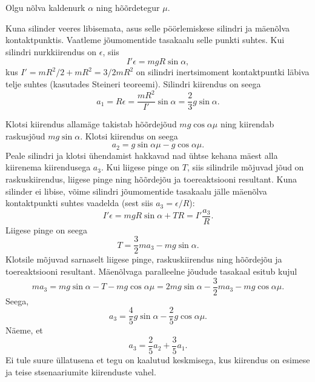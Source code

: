 \newcommand{\magnetvali}{
    \begin{tikzpicture}[scale=0.70]
        \draw (-4,0) -- (4,0);
        \draw (0,-4) -- (0,4);

        \draw[thick,->] (0,2) node [anchor = east] {$(0,h)$}
                            -- ++(60:1.6)
                            node [midway, anchor = west] {$\Vec{v}$};
        \draw (0,2) -- ++ (60:1) node [midway, anchor = south east, xshift = 6] {$\alpha$}
            arc (60:90:1);

        \draw (-2,2) circle (0.25) node[above, anchor = south, yshift = 5] {$B_1$};
        \filldraw (-2,2) circle (0.05);
        
        \draw (2,-2) circle (0.25) node[above, anchor = south, yshift = 5] {$B_1$};
        \filldraw (2,-2) circle (0.05);

        \draw (2,2) circle (0.25) node[above, anchor = south, yshift = 5] {$B_2$};
        \draw (2.25,2) -- (1.75,2);
        \draw (2,1.75) -- (2,2.25);

        \draw (-2,-2) circle (0.25) node[above, anchor = south, yshift = 5] {$B_2$};
        \draw (-2.25,-2) -- (-1.75,-2);
        \draw (-2,-1.75) -- (-2,-2.25);
        
    \end{tikzpicture}
} 

\setlength{\columnsep}{20pt}

\hint

\solu
Olgu nõlva kaldenurk $\alpha$ ning hõõrdetegur $\mu$.

Kuna silinder veeres libisemata, asus selle pöörlemiskese silindri ja mäenõlva kontaktpunktis. Vaatleme jõumomentide tasakaalu selle punkti suhtes. Kui silindri nurkkiirendus on $\epsilon$, siis
\[
I'\epsilon = mgR\sin\alpha,
\]
kus $I' = mR^2/2 + mR^2 = 3/2 mR^2$ on silindri inertsimoment kontaktpuntki läbiva telje suhtes (kasutades Steineri teoreemi). Silindri kiirendus on seega
\[
a_1 = R\epsilon = \frac{mR^2}{I'} \sin\alpha = \frac{2}{3}g\sin\alpha.
\]

Klotsi kiirendus allamäge takistab hõõrdejõud $mg\cos\alpha \mu$ ning kiirendab raskusjõud $mg\sin\alpha$. Klotsi kiirendus on seega
\[
a_2 = g\sin\alpha\mu - g\cos\alpha\mu.
\]
Peale silindri ja klotsi ühendamist hakkavad nad ühtse kehana mäest alla kiirenema kiirendusega $a_3$. Kui liigese pinge on $T$, siis silindrile mõjuvad jõud on raskuskiirendus, liigese pinge ning hõõrdejõu ja toereaktsiooni resultant. Kuna silinder ei libise, võime silindri jõumomentide tasakaalu jälle mäenõlva kontaktpunkti suhtes vaadelda (sest siis $a_3 = \epsilon / R$):
\[
I'\epsilon = mgR\sin\alpha + TR = I'\frac{a_3}{R}.
\]
Liigese pinge on seega
\[
T = \frac{3}{2}ma_3 - mg\sin\alpha.
\]
Klotsile mõjuvad sarnaselt liigese pinge, raskuskiirendus ning hõõrdejõu ja toereaktsiooni resultant. Mäenõlvaga paralleelne jõudude tasakaal esitub kujul
\[
ma_3 = mg\sin\alpha - T - mg\cos\alpha\mu = 2mg\sin\alpha - \frac{3}{2}ma_3 - mg\cos\alpha\mu.
\]
Seega,
\[
a_3 = \frac{4}{5}g\sin\alpha - \frac{2}{5}g\cos\alpha\mu.
\]
Näeme, et
\[
a_3 = \frac{2}{5}a_2 + \frac{3}{5}a_1.
\]
Ei tule suure üllatusena et tegu on kaalutud keskmisega, kus kiirendus on esimese ja teise stsenaariumite kiirenduste vahel.

